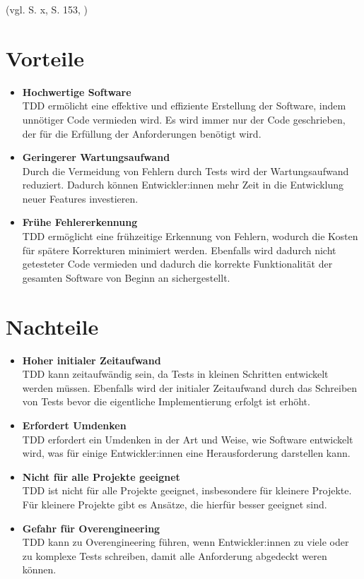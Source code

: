 \documentclass[a0,landscape]{a0poster}
\begin{document}
\begin{multicols}{4}
(vgl. \cite{beck_test_2022} S. x, \cite{schatten_qualitatssicherung_2010} S. 153, \cite{ionos_test_2020})


\section*{Vorteile}
\begin{itemize}
    \item \textbf{Hochwertige Software}\\
    TDD ermölicht eine effektive und effiziente Erstellung der Software, indem unnötiger Code vermieden wird. Es wird immer nur der Code geschrieben, der für die Erfüllung der Anforderungen benötigt wird.
    \item \textbf{Geringerer Wartungsaufwand}\\
    Durch die Vermeidung von Fehlern durch Tests wird der Wartungsaufwand reduziert. Dadurch können Entwickler:innen mehr Zeit in die Entwicklung neuer Features investieren.
    \item \textbf{Frühe Fehlererkennung}\\
    TDD ermöglicht eine frühzeitige Erkennung von Fehlern, wodurch die Kosten für spätere Korrekturen minimiert werden. Ebenfalls wird dadurch nicht getesteter Code vermieden und dadurch die korrekte Funktionalität der gesamten Software von Beginn an sichergestellt.
\end{itemize}

\section*{Nachteile}
\begin{itemize}
    \item \textbf{Hoher initialer Zeitaufwand}\\
    TDD kann zeitaufwändig sein, da Tests in kleinen Schritten entwickelt werden müssen. Ebenfalls wird der initialer Zeitaufwand durch das Schreiben von Tests bevor die eigentliche Implementierung erfolgt ist erhöht.
    \item \textbf{Erfordert Umdenken}\\
    TDD erfordert ein Umdenken in der Art und Weise, wie Software entwickelt wird, was für einige Entwickler:innen eine Herausforderung darstellen kann.
    \item \textbf{Nicht für alle Projekte geeignet}\\
    TDD ist nicht für alle Projekte geeignet, insbesondere für kleinere Projekte. Für kleinere Projekte gibt es Ansätze, die hierfür besser geeignet sind.
    \item \textbf{Gefahr für Overengineering}\\
    TDD kann zu Overengineering führen, wenn Entwickler:innen zu viele oder zu komplexe Tests schreiben, damit alle Anforderung abgedeckt weren können.
\end{itemize}


\end{multicols}
\end{document}
